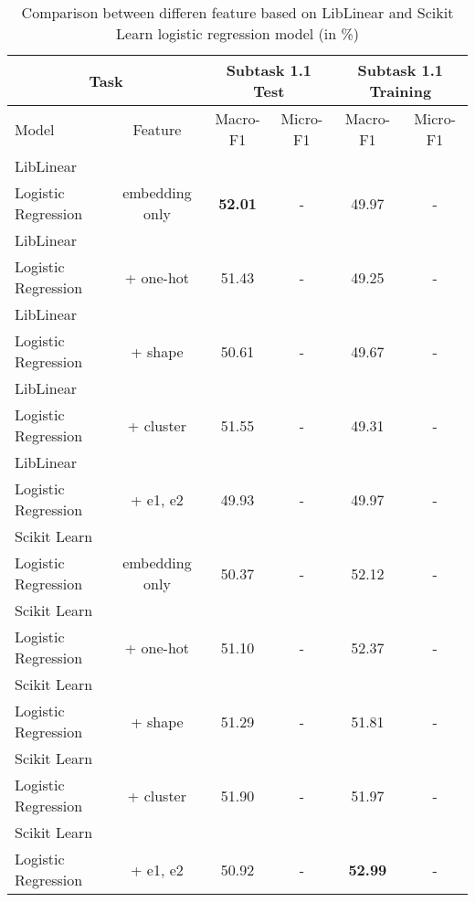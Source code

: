 \begin{table}[htbp!] %
    \centering
    \begin{tabular}{lccccc}
    \toprule
        \multicolumn{2}{c}{Task}                            & \multicolumn{2}{c}{Subtask 1.1 Test}  & \multicolumn{2}{c}{Subtask 1.1 Training} \\
    \midrule
        Model & Feature                                     & Macro-F1         & Micro-F1           & Macro-F1         & Micro-F1       \\
    \midrule
        LibLinear\\ Logistic Regression    & embedding only & \bf52.01         & -                  & 49.97            & -              \\
        LibLinear\\ Logistic Regression    & + one-hot      & 51.43            & -                  & 49.25            & -              \\
        LibLinear\\ Logistic Regression    & + shape        & 50.61            & -                  & 49.67            & -              \\
        LibLinear\\ Logistic Regression    & + cluster      & 51.55            & -                  & 49.31            & -              \\
        LibLinear\\ Logistic Regression    & + e1, e2       & 49.93            & -                  & 49.97            & -              \\
        Scikit Learn\\ Logistic Regression & embedding only & 50.37            & -                  & 52.12            & -              \\
        Scikit Learn\\ Logistic Regression & + one-hot      & 51.10            & -                  & 52.37            & -              \\
        Scikit Learn\\ Logistic Regression & + shape        & 51.29            & -                  & 51.81            & -              \\
        Scikit Learn\\ Logistic Regression & + cluster      & 51.90            & -                  & 51.97            & -              \\
        Scikit Learn\\ Logistic Regression & + e1, e2       & 50.92            & -                  & \bf52.99         & -              \\
    \bottomrule
    \end{tabular}
\caption{Comparison between differen feature based on LibLinear and Scikit Learn logistic regression model (in \%)}
\label{tab:feature}
\end{table}

